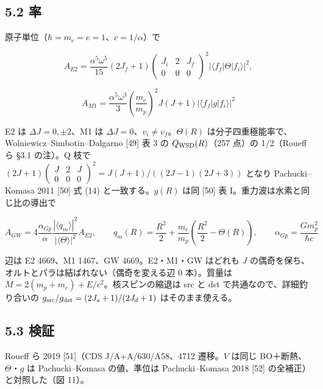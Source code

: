 \documentclass[
  a4paper,
]{ltjsarticle}
\begin{document}
\subsection{5.2 率}\label{ux7387}

原子単位（\(\hbar=m_e=e=1\)、\(c=1/\alpha\)）で

\[
A_{E2}=\frac{\alpha^5\omega^5}{15}(2J_f+1)\begin{pmatrix}J_i&2&J_f\\0&0&0\end{pmatrix}^2|\langle f_f|\Theta|f_i\rangle|^2,
\]

\[
A_{M1}=\frac{\alpha^5\omega^3}{3}\left(\frac{m_e}{m_p}\right)^2J(J+1)|\langle f_f|g|f_i\rangle|^2
\]

E2 は \(\Delta J=0,\pm2\)、M1 は
\(\Delta J=0\)、\(v_i\ne v_f\)。\(\Theta(R)\)
は分子四重極能率で、Wolniewicz--Simbotin--Dalgarno {[}49{]} 表 3 の
\(Q_{\rm WSD}(R)\)（257 点）の 1/2（Roueff ら §3.1 の注）。Q 枝で
\((2J+1)\begin{pmatrix}J&2&J\\0&0&0\end{pmatrix}^2=J(J+1)/((2J-1)(2J+3))\)
となり Pachucki--Komasa 2011 {[}50{]} 式 (14) と一致する。\(g(R)\) は同
{[}50{]} 表 I。重力波は水素と同じ比の導出で

\[
A_{GW}=4\frac{\alpha_{Gp}}{\alpha}\frac{|\langle q_m\rangle|^2}{|\langle\Theta\rangle|^2}A_{E2},\qquad q_m(R)=\frac{R^2}{2}+\frac{m_e}{m_p}\left(\frac{R^2}{2}-\Theta(R)\right),\qquad \alpha_{Gp}=\frac{Gm_p^2}{\hbar c}
\]

辺は E2 4669、M1 1467、GW 4669。E2・M1・GW はどれも \(J\)
の偶奇を保ち、オルトとパラは結ばれない（偶奇を変える辺 0 本）。質量は
\(M=2(m_p+m_e)+E/c^2\)。核スピンの縮退は src と dst
で共通なので、詳細釣り合いの
\(g_{\rm src}/g_{\rm dst}=(2J_s+1)/(2J_d+1)\) はそのまま使える。

\subsection{5.3 検証}\label{ux691cux8a3c}

Roueff ら 2019 {[}51{]}（CDS J/A+A/630/A58、4712 遷移。\(V\) は同じ
BO＋断熱、\(\Theta\)・\(g\) は Pachucki--Komasa の値、準位は
Pachucki--Komasa 2018 {[}52{]} の全補正）と対照した（図 11）。
\end{document}
